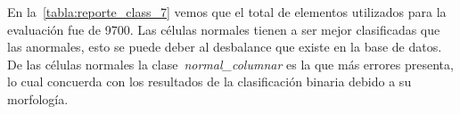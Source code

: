 En la~\autoref{tabla:reporte_class_7} vemos que el total de elementos utilizados
para la evaluación fue de 9700. Las células normales tienen a ser mejor clasificadas que
las anormales, esto se puede deber al desbalance que existe en la base de datos. De las
células normales la clase~\emph{normal\_columnar} es la que más errores presenta, lo cual
concuerda con los resultados de la clasificación binaria debido a su morfología.

\begin{table}[H]
    \centering
    \caption{Reporte de clasificación multi-clase}\label{tabla:reporte_class_7}
    \end{table}


